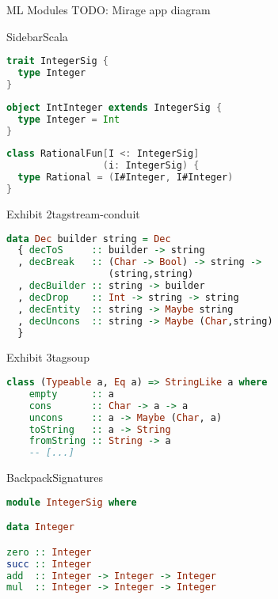 \documentclass{beamer}
\begin{document}
\begin{frame}{ML Modules}
TODO: Mirage app diagram
\end{frame}

\begin{frame}[fragile]{Sidebar}{Scala}
\begin{lstlisting}[language=Scala,title=trait \textasciitilde\ signature]
trait IntegerSig {
  type Integer
}
\end{lstlisting}
\begin{lstlisting}[language=Scala,title=object \textasciitilde\ structure]
object IntInteger extends IntegerSig {
  type Integer = Int
}
\end{lstlisting}
\begin{lstlisting}[language=Scala,title=class \textasciitilde\ functor]
class RationalFun[I <: IntegerSig]
                 (i: IntegerSig) {
  type Rational = (I#Integer, I#Integer)
}
\end{lstlisting}
\end{frame}

\begin{frame}[fragile]{Exhibit 2}{tagstream-conduit}
\begin{lstlisting}[language=Haskell]
data Dec builder string = Dec
  { decToS     :: builder -> string
  , decBreak   :: (Char -> Bool) -> string ->
                  (string,string)
  , decBuilder :: string -> builder
  , decDrop    :: Int -> string -> string
  , decEntity  :: string -> Maybe string
  , decUncons  :: string -> Maybe (Char,string)
  }
\end{lstlisting}
\end{frame}

\begin{frame}[fragile]{Exhibit 3}{tagsoup}
\begin{lstlisting}[language=Haskell]
class (Typeable a, Eq a) => StringLike a where
    empty      :: a
    cons       :: Char -> a -> a
    uncons     :: a -> Maybe (Char, a)
    toString   :: a -> String
    fromString :: String -> a
    -- [...]
\end{lstlisting}
\end{frame}

\begin{frame}[fragile]{Backpack}{Signatures}
\begin{lstlisting}[language=Haskell]
module IntegerSig where

data Integer

zero :: Integer
succ :: Integer
add  :: Integer -> Integer -> Integer
mul  :: Integer -> Integer -> Integer
\end{lstlisting}
\end{frame}
\end{document}
